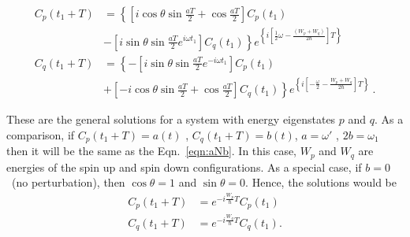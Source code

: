 \begin{align}
  C_p(t_1+T)&= \left\lbrace \left[
              i \cos \theta \sin \frac{aT}{2}+\cos \frac{aT}{2} \right] C_p(t_1)\right. \\ \nonumber
  &-
 \left . \left[i \sin \theta \sin \frac{aT}{2} e^{i \omega t_1} \right]C_q(t_1) \right\rbrace 
  e^{\left\lbrace i\left[\frac{1}{2}\omega - \frac{(W_p + W_q)}{2\hbar}\right] T\right\rbrace}
\\ \nonumber
  C_q(t_1+T)&=\left\lbrace - \left[ i \sin \theta \sin \frac{aT}{2} e^{-i \omega t_1}\right]C_p(t_1) \right . \\ \nonumber
  &+
\left .  \left[-i \cos \theta \sin \frac{aT}{2}+ \cos \frac{aT}{2}\right] C_q(t_1)\right\rbrace
  e^{\left\lbrace i \left[ -\frac{\omega}{2}- \frac{W_p+W_q}{2\hbar} \right] T \right\rbrace}~.
\end{align}

These are the general solutions for a system with energy eigenstates
$p$ and $q$. As a comparison, if $C_p(t_1+T)=a(t)$ ,
$C_q(t_1+T)=b(t)$, $a= \omega'$ , $2b=\omega_1$ then it will be the
same as the Eqn.~\ref{eqn:aNb}. In this case, $W_p$ and $W_q$ are
energies of the spin up and spin down configurations.  As a special
case, if $b=0$~(no perturbation), then $\cos \theta=1$ and
$\sin \theta=0$. Hence, the solutions would be
\begin{align}
C_p(t_1+T) &= e^{-i \frac{W_p}{\hbar} T} C_p(t_1) \\ \nonumber
C_q(t_1+T) &=e^{-i \frac{W_q}{\hbar}T} C_q(t_1).
\end{align}

